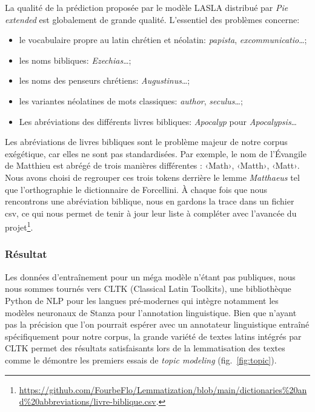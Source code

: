 \documentclass[final, fra]{anthology-ch}      %
\begin{document}
La qualité de la prédiction proposée par le modèle LASLA distribué par \textit{Pie extended} \cite{thibault_clerice_2020_3883590} est globalement de grande qualité. L'essentiel des problèmes concerne:
\begin{itemize}
\item le vocabulaire propre au latin chrétien et néolatin: \textit{papista}, \textit{excommunicatio}…;
\item les noms bibliques: \textit{Ezechias}…; 
\item les noms des penseurs chrétiens: \textit{Augustinus}…; 
\item les variantes néolatines de mots classiques:  \textit{author}, \textit{seculus}…; 
\item Les abréviations des différents livres bibliques: \textit{Apocalyp} pour \textit{Apocalypsis}…
\end{itemize}
Les abréviations de livres bibliques sont le problème majeur de notre corpus exégétique, car elles ne sont pas standardisées. Par exemple, le nom de l'Évangile de Matthieu est abrégé de trois manières différentes : ‹Math›, ‹Matth›, ‹Matt›. Nous avons choisi de regrouper ces trois tokens derrière le lemme \textit{Matthaeus} tel que l'orthographie le dictionnaire de Forcellini. À chaque fois que nous rencontrons une abréviation biblique, nous en gardons la trace dans un fichier csv, ce qui nous permet de tenir à jour leur liste à compléter avec l'avancée du projet\footnote{\url{https://github.com/FourbeFlo/Lemmatization/blob/main/dictionaries\%20and\%20abbreviations/livre-biblique.csv}.
}.

\subsubsection{Résultat}

Les données d'entraînement pour un méga modèle n'étant pas publiques, nous nous sommes tournés vers CLTK (Classical Latin Toolkits)\cite{johnson-etal-2021-classical}, une bibliothèque Python de NLP pour les langues pré-modernes qui intègre notamment les modèles neuronaux de Stanza \cite{qi2020stanzapythonnaturallanguage}\cite{burns2023latincysynthetictrainedpipelines} pour l’annotation linguistique. Bien que n'ayant pas la précision que l'on pourrait espérer avec un annotateur linguistique entraîné spécifiquement pour notre corpus, la grande variété de textes latins intégrés par CLTK permet des résultats satisfaisants lors de la lemmatisation des textes comme le démontre les premiers essais de \textit{topic modeling} (fig.~\ref{fig:topic}). %
\end{document}
